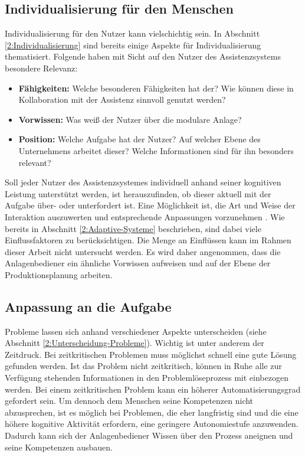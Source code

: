 \subsection{Individualisierung für den Menschen}
Individualisierung für den Nutzer kann vielschichtig sein. In Abschnitt \ref{2:Individualisierung} sind bereits einige Aspekte für Individualisierung thematisiert. Folgende haben mit Sicht auf den Nutzer des Assistenzsystems besondere Relevanz:
\begin{itemize}
\item \textbf{Fähigkeiten:} Welche besonderen Fähigkeiten hat der? Wie können diese in Kollaboration mit der Assistenz sinnvoll genutzt werden?
\item \textbf{Vorwissen:} Was weiß der Nutzer über die modulare Anlage?
\item \textbf{Position:} Welche Aufgabe hat der Nutzer? Auf welcher Ebene des Unternehmens arbeitet dieser? Welche Informationen sind für ihn besonders relevant?
\end{itemize}
Soll jeder Nutzer des Assistenzsystemes individuell anhand seiner kognitiven Leistung unterstützt werden, ist herauszufinden, ob dieser aktuell mit der Aufgabe über- oder unterfordert ist. Eine Möglichkeit ist, die Art und Weise der Interaktion auszuwerten und entsprechende Anpassungen vorzunehmen . Wie bereits in Abschnitt \ref{2:Adaptive-Systeme} beschrieben, sind dabei viele Einflussfaktoren zu berücksichtigen. Die Menge an Einflüssen kann im Rahmen dieser Arbeit nicht untersucht werden. Es wird daher angenommen, dass die Anlagenbediener ein ähnliche Vorwissen aufweisen und auf der Ebene der Produktionsplanung arbeiten.

\subsection{Anpassung an die Aufgabe}
\label{3:Anpassung-Aufgabe}
Probleme lassen sich anhand verschiedener Aspekte unterscheiden (siehe Abschnitt \ref{2:Unterscheidung-Probleme}). Wichtig ist unter anderem der Zeitdruck. Bei zeitkritischen Problemen muss möglichst schnell eine gute Lösung gefunden werden. Ist das Problem nicht zeitkritisch, können in Ruhe alle zur Verfügung stehenden Informationen in den Problemlöseprozess mit einbezogen werden. Bei einem zeitkritischen Problem kann ein höherer Automatisierungsgrad gefordert sein. Um dennoch dem Menschen seine Kompetenzen nicht abzusprechen, ist es möglich bei Problemen, die eher langfristig sind und die eine höhere kognitive Aktivität erfordern, eine geringere Autonomiestufe anzuwenden. Dadurch kann sich der Anlagenbediener Wissen über den Prozess aneignen und seine Kompetenzen ausbauen.

